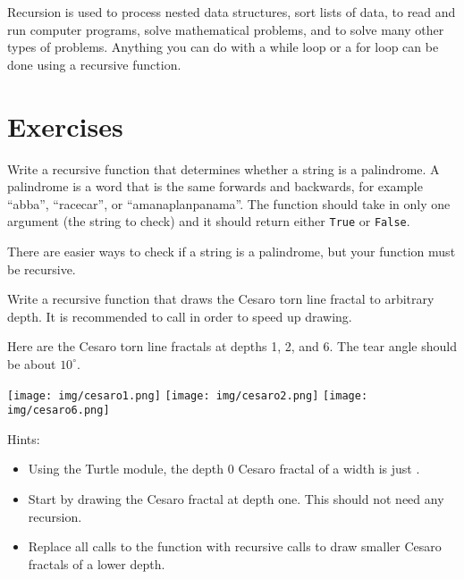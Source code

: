 \documentclass[11pt]{cselabheader}
\begin{document}
Recursion is used to process nested data structures, sort lists of data,
to read and run computer programs, solve mathematical problems, and
to solve many other types of problems. Anything you can do with a while loop or a for
loop can be done using a recursive function.

\newpage
\section{Exercises}\label{exercises}

\begin{ex}[palindrome.py] Write a recursive function that determines
whether a string is a palindrome. A palindrome is a word that is the
same forwards and backwards, for example ``abba'', ``racecar'', or ``amanaplanpanama''.
The function should take in only one argument (the string to
check) and it should return either \lstinline{True} or \lstinline{False}.

There are easier ways to check if a string is a
palindrome, but your function must be recursive.
\end{ex}

\begin{ex}[cesaro.py]
Write a recursive function that draws the Cesaro torn line fractal to
arbitrary depth. It is recommended to call
 in order to speed up drawing.

Here are the Cesaro torn line fractals at depths 1, 2, and 6.
The tear angle should be about $10^\circ$.

\begin{center}
\texttt{[image: img/cesaro1.png]}
\texttt{[image: img/cesaro2.png]}
\texttt{[image: img/cesaro6.png]}
\end{center}

Hints:
\begin{itemize}
\item Using the Turtle module, the depth 0 Cesaro fractal of a width
 is just .
\item Start by drawing the Cesaro fractal at depth one. This should
not need any recursion.
\item Replace all calls to the  function
with recursive calls to draw smaller Cesaro fractals of a lower depth.
\end{itemize}
\end{ex}
\end{document}
